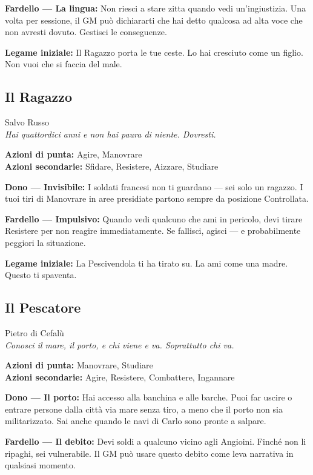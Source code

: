 \textbf{Fardello — La lingua:} Non riesci a stare zitta quando
vedi un'ingiustizia. Una volta per sessione, il GM può dichiararti
che hai detto qualcosa ad alta voce che non avresti dovuto. Gestisci
le conseguenze.

\textbf{Legame iniziale:} Il Ragazzo porta le tue ceste. Lo hai
cresciuto come un figlio. Non vuoi che si faccia del male.

\filetto

\subsection{Il Ragazzo}
{\cinzel\footnotesize\color{grigionote} Salvo Russo}\\
\textit{Hai quattordici anni e non hai paura di niente. Dovresti.}

\textbf{Azioni di punta:} Agire, Manovrare\\
\textbf{Azioni secondarie:} Sfidare, Resistere, Aizzare, Studiare

\textbf{Dono — Invisibile:} I soldati francesi non ti guardano —
sei solo un ragazzo. I tuoi tiri di Manovrare in aree presidiate
partono sempre da posizione Controllata.

\textbf{Fardello — Impulsivo:} Quando vedi qualcuno che ami in
pericolo, devi tirare Resistere per non reagire immediatamente.
Se fallisci, agisci — e probabilmente peggiori la situazione.

\textbf{Legame iniziale:} La Pescivendola ti ha tirato su. La ami
come una madre. Questo ti spaventa.

\filetto

\subsection{Il Pescatore}
{\cinzel\footnotesize\color{grigionote} Pietro di Cefalù}\\
\textit{Conosci il mare, il porto, e chi viene e va. Soprattutto chi va.}

\textbf{Azioni di punta:} Manovrare, Studiare\\
\textbf{Azioni secondarie:} Agire, Resistere, Combattere, Ingannare

\textbf{Dono — Il porto:} Hai accesso alla banchina e alle barche.
Puoi far uscire o entrare persone dalla città via mare senza tiro,
a meno che il porto non sia militarizzato. Sai anche quando le navi
di Carlo sono pronte a salpare.

\textbf{Fardello — Il debito:} Devi soldi a qualcuno vicino agli
Angioini. Finché non li ripaghi, sei vulnerabile. Il GM può usare
questo debito come leva narrativa in qualsiasi momento.

